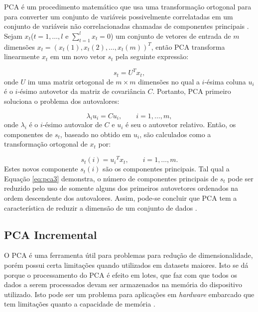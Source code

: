 PCA é um procedimento matemático que usa uma transformação ortogonal para para converter um conjunto de variáveis possivelmente correlatadas em um conjunto de variáveis não correlacionadas chamadas de componentes principais \cite{wold1987principal}. Sejam $x_t$($t=1,\ldots,l$ e $\sum_{t=1}^{l}{x_t}=0$) um conjunto de vetores de entrada de $m$ dimensões ${x_t}=({x_t}(1),{x_t}(2),\ldots,{x_t}(m))^T$, então PCA transforma linearmente $x_t$ em um novo vetor $s_t$ pela seguinte expressão:

\begin{equation}\label{eq:pca1}
{s_t} = {U^T}{x_t},
\end{equation}
onde $U$ im uma matriz ortogonal de  $m \times m$ dimensões no qual a  $i$-ésima coluna $u_i$ é o $i$-ésimo autovetor da matriz de covariância  $C$. Portanto, PCA primeiro soluciona o problema dos autovalores:

\begin{equation}\label{eq:pca2}
{\lambda _i}{u_i} = C{u_i}, \qquad i=1,\ldots,m,
\end{equation}
onde $\lambda _i$ é o $i$-ésimo autovalor de $C$ e ${u_i}$ é seu o autovetor relativo. Então, os componentes de ${s_t}$, baseado no obtido em ${u_i}$, são calculados como a transformação ortogonal de ${x_t}$ por:

\begin{equation}\label{eq:pca3}
{s_t}(i) = {u_i}^T{x_t}, \qquad i=1,\ldots,m.
\end{equation}
Estes novos componente ${s_t}(i)$ são os componentes principais. Tal qual a Equação \ref{eq:pca3} demonstra, o número de componentes principais de $s_t$ pode ser reduzido pelo uso de somente alguns dos primeiros autovetores ordenados na ordem descendente dos autovalores. Assim, pode-se concluir que PCA tem a característica de reduzir a dimensão de um conjunto de dados \cite{cao2003comparison}. 

\subsection{PCA Incremental}

O PCA é uma ferramenta útil para problemas para redução de dimensionalidade, porém possui certa limitações quando utilizados em datasets maiores. Isto se dá porque o processamento do PCA é efeito em lotes, que faz com que todos os dados a serem processados devam ser armazenados na memória do dispositivo utilizado. Isto pode ser um problema para aplicações em \textit{hardware} embarcado que tem limitações quanto a capacidade de memória \cite{scikit-learn}.

